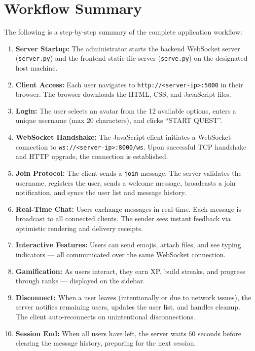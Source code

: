 \documentclass[12pt, a4paper]{article}
\begin{document}
\section{Workflow Summary}

The following is a step-by-step summary of the complete application workflow:

\begin{enumerate}[leftmargin=*]
    \item \textbf{Server Startup:} The administrator starts the backend WebSocket server (\texttt{server.py}) and the frontend static file server (\texttt{serve.py}) on the designated host machine.

    \item \textbf{Client Access:} Each user navigates to \texttt{http://<server-ip>:5000} in their browser. The browser downloads the HTML, CSS, and JavaScript files.

    \item \textbf{Login:} The user selects an avatar from the 12 available options, enters a unique username (max 20 characters), and clicks ``START QUEST''.

    \item \textbf{WebSocket Handshake:} The JavaScript client initiates a WebSocket connection to \texttt{ws://<server-ip>:8000/ws}. Upon successful TCP handshake and HTTP upgrade, the connection is established.

    \item \textbf{Join Protocol:} The client sends a \texttt{join} message. The server validates the username, registers the user, sends a welcome message, broadcasts a join notification, and syncs the user list and message history.

    \item \textbf{Real-Time Chat:} Users exchange messages in real-time. Each message is broadcast to all connected clients. The sender sees instant feedback via optimistic rendering and delivery receipts.

    \item \textbf{Interactive Features:} Users can send emojis, attach files, and see typing indicators — all communicated over the same WebSocket connection.

    \item \textbf{Gamification:} As users interact, they earn XP, build streaks, and progress through ranks — displayed on the sidebar.

    \item \textbf{Disconnect:} When a user leaves (intentionally or due to network issues), the server notifies remaining users, updates the user list, and handles cleanup. The client auto-reconnects on unintentional disconnections.

    \item \textbf{Session End:} When all users have left, the server waits 60 seconds before clearing the message history, preparing for the next session.
\end{enumerate}
\end{document}
